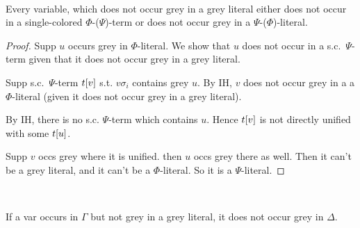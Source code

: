 \documentclass[,%
	draft=false,%
	numbers=noendperiod
	12pt,
	a4paper,
	oneside,%
	openany,
]{memoir}
\begin{document}
~

\begin{clemma}
	Every variable, which does not occur grey in a grey literal either does not occur in a single-colored $\Phi$-($\Psi$)-term or does not occur grey in a $\Psi$-($\Phi$)-literal.
\end{clemma}
\begin{proof}
	Supp $u$ occurs grey in $\Phi$-literal.
	We show that $u$ does not occur in a s.c.\ $\Psi$-term given that it does not occur grey in a grey literal.

	Supp s.c.\ $\Psi$-term $t[v]$ s.t. $v\sigma_i$ contains grey $u$.
	By IH, $v$ does not occur grey in a a $\Phi$-literal (given it does not occur grey in a grey literal). 

	By IH, there is no s.c.{} $\Psi$-term which contains $u$.
	Hence $t[v]$ is not directly unified with some $t[u]$.

	Supp $v$ occs grey where it is unified. then $u$ occs grey there as well.
	Then it can't be a grey literal, and it can't be a $\Phi$-literal. So it is a $\Psi$-literal.

\end{proof}

~

\begin{clemma}
	If a var occurs in $\Gamma$ but not grey in a grey literal, it does not occur grey in $\Delta$.
\end{clemma}
\end{document}
